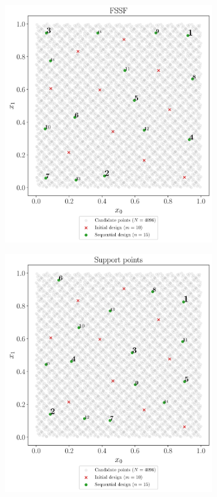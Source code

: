 \begin{figure}
    \centering
    \begin{subfigure}[b]{0.48\linewidth}
        \centering
        \includegraphics[width=\textwidth]{./part2/figures/SIS/uniform2D_FSSF.pdf}
    \end{subfigure}
    \begin{subfigure}[b]{0.48\linewidth}
        \centering
        \includegraphics[width=\textwidth]{./part2/figures/SIS/uniform2D_SP.pdf}

\end{subfigure}
\end{figure}
